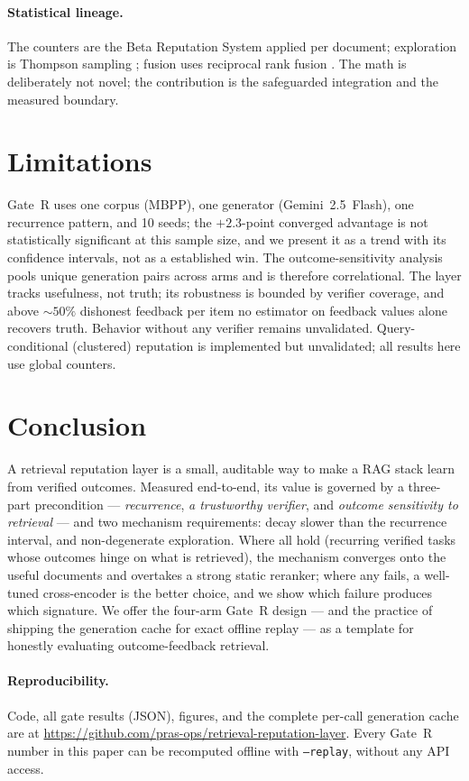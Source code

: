 \documentclass[11pt]{article}
\begin{document}
\paragraph{Statistical lineage.} The counters are the Beta Reputation System
\citep{josang2002beta} applied per document; exploration is Thompson sampling
\citep{chapelle2011empirical}; fusion uses reciprocal rank fusion
\citep{cormack2009rrf}. The math is deliberately not novel; the contribution
is the safeguarded integration and the measured boundary.

\section{Limitations}
\label{sec:limitations}

Gate~R uses one corpus (MBPP), one generator (Gemini~2.5~Flash), one
recurrence pattern, and 10 seeds; the $+2.3$-point converged advantage is not
statistically significant at this sample size, and we present it as a trend
with its confidence intervals, not as a established win. The
outcome-sensitivity analysis pools unique generation pairs across arms and is
therefore correlational. The layer tracks usefulness, not truth; its
robustness is bounded by verifier coverage, and above ${\sim}50\%$ dishonest
feedback per item no estimator on feedback values alone recovers truth.
Behavior without any verifier remains unvalidated. Query-conditional
(clustered) reputation is implemented but unvalidated; all results here use
global counters.

\section{Conclusion}

A retrieval reputation layer is a small, auditable way to make a RAG stack
learn from verified outcomes. Measured end-to-end, its value is governed by a
three-part precondition --- \emph{recurrence}, \emph{a trustworthy verifier},
and \emph{outcome sensitivity to retrieval} --- and two mechanism
requirements: decay slower than the recurrence interval, and non-degenerate
exploration. Where all hold (recurring verified tasks whose outcomes hinge on
what is retrieved), the mechanism converges onto the useful documents and
overtakes a strong static reranker; where any fails, a well-tuned
cross-encoder is the better choice, and we show which failure produces which
signature. We offer the four-arm Gate~R design --- and the practice of
shipping the generation cache for exact offline replay --- as a template for
honestly evaluating outcome-feedback retrieval.

\paragraph{Reproducibility.} Code, all gate results (JSON), figures, and the
complete per-call generation cache are at
\url{https://github.com/pras-ops/retrieval-reputation-layer}. Every Gate~R
number in this paper can be recomputed offline with
\texttt{--replay}, without any API access.



\end{document}
